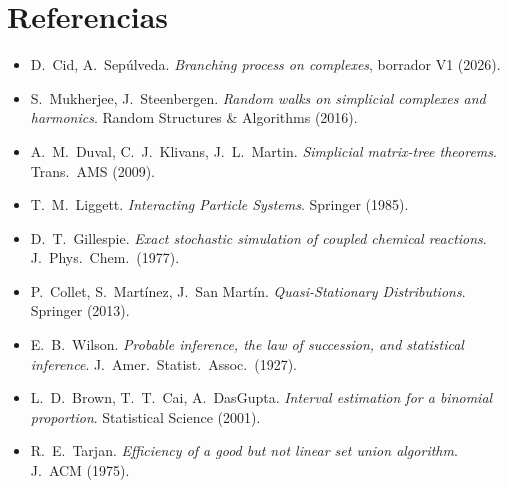 \documentclass[11pt,a4paper]{article}
\theoremstyle{plain}
\theoremstyle{remark}
\begin{document}
\section*{Referencias}
\begin{itemize}[nosep]
  \item D.~Cid, A.~Sepúlveda. \emph{Branching process on complexes}, borrador V1 (2026).
  \item S.~Mukherjee, J.~Steenbergen. \emph{Random walks on simplicial complexes and harmonics}. Random Structures \& Algorithms (2016).
  \item A.~M.~Duval, C.~J.~Klivans, J.~L.~Martin. \emph{Simplicial matrix-tree theorems}. Trans.\ AMS (2009).
  \item T.~M.~Liggett. \emph{Interacting Particle Systems}. Springer (1985).
  \item D.~T.~Gillespie. \emph{Exact stochastic simulation of coupled chemical reactions}. J.\ Phys.\ Chem.\ (1977).
  \item P.~Collet, S.~Martínez, J.~San Martín. \emph{Quasi-Stationary Distributions}. Springer (2013).
  \item E.~B.~Wilson. \emph{Probable inference, the law of succession, and statistical inference}. J.\ Amer.\ Statist.\ Assoc.\ (1927).
  \item L.~D.~Brown, T.~T.~Cai, A.~DasGupta. \emph{Interval estimation for a binomial proportion}. Statistical Science (2001).
  \item R.~E.~Tarjan. \emph{Efficiency of a good but not linear set union algorithm}. J.\ ACM (1975).
\end{itemize}
\end{document}
